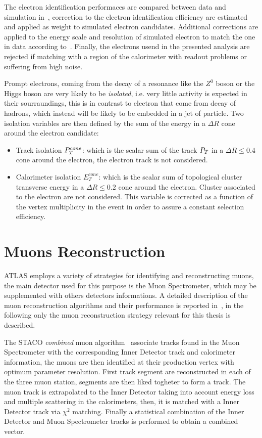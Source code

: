 The electron identification performaces are compared between data and simulation in~\cite{eleEff}, 
correction to the electron identification efficiency are estimated and 
applied as weight to simulated electron candidates. Additional corrections are applied to the energy scale and resolution
of simulated electron to match the one in data according to~\cite{eleEnergy}.
Finally, the electrons usend in the presented analysis are rejected if matching 
with a region of the calorimeter with readout problems or suffering from high noise.

Prompt electrons, coming from the decay of a resonance like the $Z^0$ boson or the Higgs boson are very
likely to be \emph{isolated}, i.e. very little activity is expected in their sourraundings, this is in contrast
to electron that come from decay of hadrons, which instead will be likely to be embedded in a jet of particle.
Two isolation variables are then defined by the sum of the energy in a $\Delta R$ cone around the electron
candidate:
\begin{itemize}
	\item Track isolation $P_{T}^{cone}$: which is the scalar sum of the track $P_{T}$ in a $\Delta R \leq 0.4$
	cone around the electron, the electron track is not considered.
	
	\item Calorimeter isolation $E_T^{cone}$: which is the scalar sum of  topological cluster transverse energy
	 in a  $\Delta R \leq 0.2$ cone around the electron. Cluster associated to the electron are not considered.
	 This variable is corrected as a function of the vertex multiplicity in the event in order to assure a constant 
	 selection efficiency.
\end{itemize}



\section{Muons Reconstruction}\label{sec:muon}
ATLAS employs a variety of strategies for identifying and reconstructing muons, 
the main detector used for this purpose is the Muon Spectrometer, which may be supplemented with
others detectors informations. A detailed description
of the muon reconstruction algorithms and their performance is reported in~\cite{AtlasCSCBook},
in the following only the muon reconstruction strategy relevant for this thesis is described.

The STACO \emph{combined} muon algorithm~\cite{staco} associate tracks found in the
Muon Spectrometer with the corresponding Inner Detector track and calorimeter information, the muons are then
 identified at their production vertex with optimum parameter resolution.
First  track segment are reconstructed in each of the three
muon station, segments are then liked togheter to form a track. The muon track is
extrapolated to the Inner Detector taking into account energy loss and multiple scattering in the calorimeters,
then, it is  matched with a Inner Detector track via $\chi^2$ matching. Finally
a statistical combination of the Inner Detector and Muon Spectrometer tracks is performed to obtain a combined vector. 

